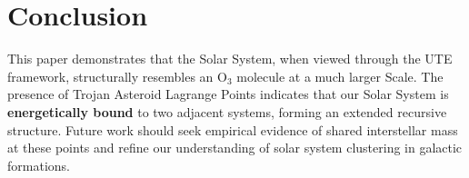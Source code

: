 \documentclass{article}
\begin{document}
\section{Conclusion}
This paper demonstrates that the Solar System, when viewed through the UTE framework, structurally resembles an O$_3$ molecule at a much larger Scale. The presence of Trojan Asteroid Lagrange Points indicates that our Solar System is \textbf{energetically bound} to two adjacent systems, forming an extended recursive structure. Future work should seek empirical evidence of shared interstellar mass at these points and refine our understanding of solar system clustering in galactic formations.
\end{document}
